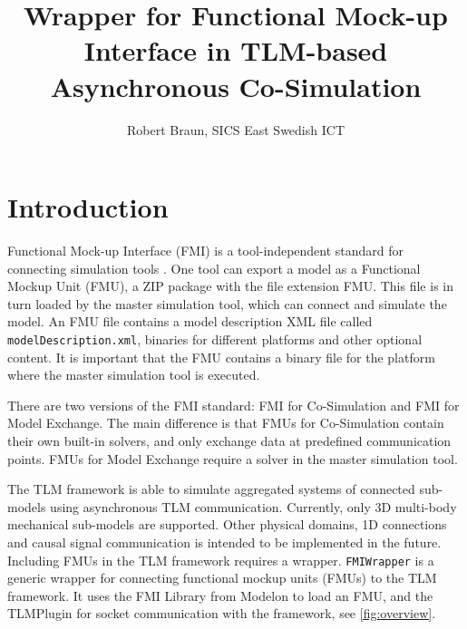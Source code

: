 \documentclass[11pt,a4paper,english]{report}
\begin{document}


\title{Wrapper for Functional Mock-up Interface in TLM-based Asynchronous Co-Simulation}


\author{
  Robert Braun, SICS East Swedish ICT
}


\makefrontpage

\clearpage
\section{Introduction}
Functional Mock-up Interface (FMI) is a tool-independent standard for connecting simulation tools \cite{blochwitz2009}. 
One tool can export a model as a Functional Mockup Unit (FMU), a ZIP package with the file extension FMU. 
This file is in turn loaded by the master simulation tool, which can connect and simulate the model.
An FMU file contains a model description XML file called \texttt{modelDescription.xml}, binaries for different platforms and other optional content.
It is important that the FMU contains a binary file for the platform where the master simulation tool is executed.

There are two versions of the FMI standard: FMI for Co-Simulation and FMI for Model Exchange.
The main difference is that FMUs for Co-Simulation contain their own built-in solvers, and only exchange data at predefined communication points.
FMUs for Model Exchange require a solver in the master simulation tool.

The TLM framework is able to simulate aggregated systems of connected sub-models using asynchronous TLM communication. 
Currently, only 3D multi-body mechanical sub-models are supported.
Other physical domains, 1D connections and causal signal communication is intended to be implemented in the future.
Including FMUs in the TLM framework requires a wrapper.
\texttt{FMIWrapper} is a generic wrapper for connecting functional mockup units (FMUs) to the TLM framework.
It uses the FMI Library from Modelon \cite{modelon2015} to load an FMU, and the TLMPlugin for socket communication with the framework, see \cref{fig:overview}.
\end{document}
